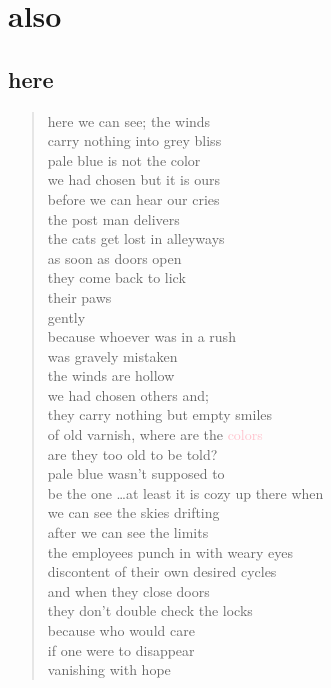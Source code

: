 \documentclass[11pt]{article}
\begin{document}
\section{also}
\label{sec:org220ffeb}
\subsection{here}
\label{sec:orgb97216f}
\begin{verse}
here we can see; the winds\\
carry nothing into grey bliss\\
pale blue is not the color\\
we had chosen but it is ours\\
before we can hear our cries\\
the post man delivers\\
the cats get lost in alleyways\\
as soon as doors open\\
they come back to lick\\
their paws\\
gently\\
because whoever was in a rush\\
was gravely mistaken\\
\vspace*{1em}
the winds are hollow\\
we had chosen others and;\\
they carry nothing but empty smiles\\
of old varnish, where are the \textcolor{pink}{colors}\\
are they too old to be told?\\
pale blue wasn't supposed to\\
be the one \ldots at least it is cozy up there when\\
we can see the skies drifting\\
\vspace*{1em}
after we can see the limits\\
the employees punch in with weary eyes\\
discontent of their own desired cycles\\
and when they close doors\\
they don't double check the locks\\
because who would care\\
if one were to disappear\\
vanishing with hope\\
\end{verse}
\end{document}
